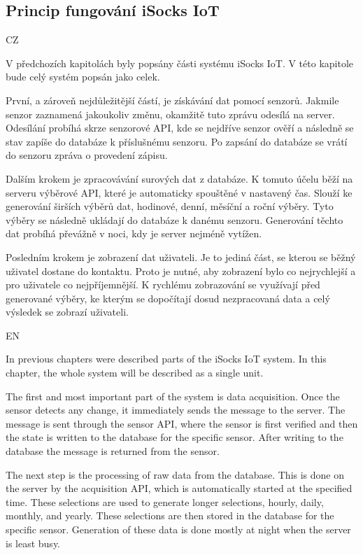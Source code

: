 \documentclass[12pt, a4paper]{article}
\begin{document}
\subsection*{Princip fungování iSocks IoT}

CZ

V předchozích kapitolách byly popsány části systému iSocks IoT.
V této kapitole bude celý systém popsán jako celek.

První, a zároveň nejdůležitější částí, je získávání dat pomocí senzorů.
Jakmile senzor zaznamená jakoukoliv změnu, okamžitě tuto zprávu odesílá na server.
Odesílání probíhá skrze senzorové API, kde se nejdříve senzor ověří a následně se stav zapíše do databáze k příslušnému senzoru.
Po zapsání do databáze se vrátí do senzoru zpráva o provedení zápisu.

Dalším krokem je zpracovávání surových dat z databáze.
K tomuto účelu běží na serveru výběrové API, které je automaticky spouštěné v nastavený čas.
Slouží ke generování širších výběrů dat, hodinové, denní, měsíční a roční výběry.
Tyto výběry se následně ukládají do databáze k danému senzoru.
Generování těchto dat probíhá převážně v noci, kdy je server nejméně vytížen.

Posledním krokem je zobrazení dat uživateli.
Je to jediná část, se kterou se běžný uživatel dostane do kontaktu.
Proto je nutné, aby zobrazení bylo co nejrychlejší a pro uživatele co nejpříjemnější.
K rychlému zobrazování se využívají před generované výběry, ke kterým se dopočítají dosud nezpracovaná data a celý výsledek se zobrazí uživateli.

EN

In previous chapters were described parts of the iSocks IoT system.
In this chapter, the whole system will be described as a single unit.

The first and most important part of the system is data acquisition.
Once the sensor detects any change, it immediately sends the message to the server.
The message is sent through the sensor API, where the sensor is first verified and then the state is written to the database for the specific sensor.
After writing to the database the message is returned from the sensor.

The next step is the processing of raw data from the database.
This is done on the server by the acquisition API, which is automatically started at the specified time.
These selections are used to generate longer selections, hourly, daily, monthly, and yearly.
These selections are then stored in the database for the specific sensor.
Generation of these data is done mostly at night when the server is least busy.
\end{document}
